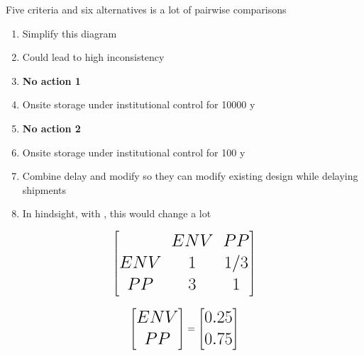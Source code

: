 \documentclass[aspectratio=1610,pdftex,dvipsnames,compress,xcolor={dvipsnames}]{beamer}
\newcommand{\acsp}{\acrshortpl} %
\begin{document}
\begin{frame}{Five criteria and six alternatives is a lot of pairwise comparisons}
    \begin{enumerate}[series=outerlist,topsep=0pt,itemsep=1pt,leftmargin=*,label=(\arabic*)]
        \item[]Simplify this diagram
        \item[]Could lead to high inconsistency  
            \vspace{0.10in}
        \item[]\textbf{No action 1}
        \item[]Onsite storage under institutional control for 10000 y
            \vspace{0.10in}
        \item[]\textbf{No action 2}
        \item[]Onsite storage under institutional control for 100 y
            \vspace{0.10in}
        \item[]Combine delay and modify so they can modify existing design while delaying shipments
            \vspace{0.10in}
        \item[]In hindsight, with \acsp{cis}, this would change a lot
    \end{enumerate}
\end{frame}


\begin{frame}{}
    \begin{equation}
        \LARGE
        \begin{bmatrix}
            & ENV & PP \\
            ENV & 1 & 1/3 \\
            PP & 3 & 1
        \end{bmatrix}
    \end{equation}

    \begin{equation}
        \LARGE
        \begin{bmatrix} ENV \\ PP \end{bmatrix} =
        \begin{bmatrix} 0.25 \\ 0.75 \end{bmatrix}
    \end{equation}
\end{frame}
\end{document}
